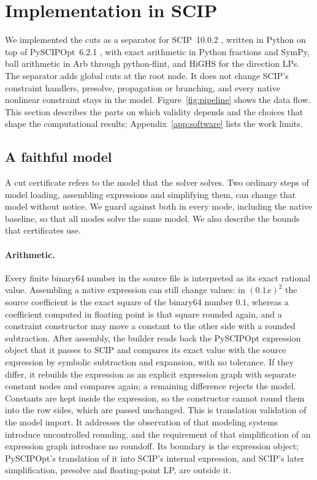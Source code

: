 \section{Implementation in SCIP}\label{sec:implementation}

We implemented the cuts as a separator for SCIP~10.0.2 \citep{SCIP10},
written in Python on top of PySCIPOpt~6.2.1 \citep{PySCIPOpt}, with exact
arithmetic in Python fractions and SymPy, ball arithmetic in Arb through
python-flint, and HiGHS for the direction LPs. The separator adds global cuts
at the root node. It does not change SCIP's constraint handlers, presolve,
propagation or branching, and every native nonlinear constraint stays in the
model. Figure~\ref{fig:pipeline} shows the data flow. This section describes
the parts on which validity depends and the choices that shape the
computational results; Appendix~\ref{app:software} lists the work limits.



\subsection{A faithful model}\label{sec:faithful}

A cut certificate refers to the model that the solver solves. Two ordinary
steps of model loading, assembling expressions and simplifying them, can
change that model without notice. We guard against both in every mode,
including the native baseline, so that all modes solve the same model. We
also describe the bounds that certificates use.

\paragraph{Arithmetic.}
Every finite binary64 number in the source file is interpreted as its exact
rational value. Assembling a native expression can still change values: in
$(0.1x)^2$ the source coefficient is the exact square of the binary64 number
$0.1$, whereas a coefficient computed in floating point is that square
rounded again, and a constraint constructor may move a constant to the other
side with a rounded subtraction. After assembly, the builder reads back the
PySCIPOpt expression object that it passes to SCIP and compares its exact
value with the source expression by symbolic subtraction and expansion, with
no tolerance. If they differ, it rebuilds the expression as an explicit
expression graph with separate constant nodes and compares again; a remaining
difference rejects the model. Constants are kept inside the expression, so
the constructor cannot round them into the row sides, which are passed
unchanged. This is translation validation
\citep{PnueliSiegelSingerman1998,Necula2000} of the model import. It
addresses the observation of \citet[Section~20]{Neumaier2004} that modeling
systems introduce uncontrolled rounding, and the requirement of
\citet[Section~3.1]{SchichlNeumaier2005} that simplification of an expression
graph introduce no roundoff. Its boundary is the expression object;
PySCIPOpt's translation of it into SCIP's internal expression, and SCIP's
later simplification, presolve and floating-point LP, are outside it.

